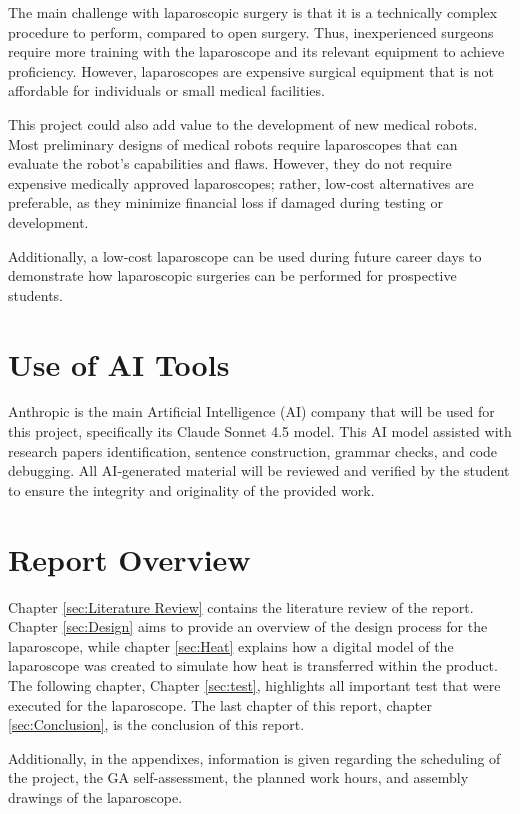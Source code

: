 The main challenge with laparoscopic surgery is that it is a technically complex procedure to perform, compared to open surgery. Thus, inexperienced surgeons require more training with the laparoscope and its relevant equipment to achieve proficiency. However, laparoscopes are expensive surgical equipment that is not affordable for individuals or small medical facilities. 



This project could also add value to the development of new medical robots. Most preliminary designs of medical robots require laparoscopes that can evaluate the robot’s capabilities and flaws. However, they do not require expensive medically approved laparoscopes; rather, low‑cost alternatives are preferable, as they minimize financial loss if damaged during testing or development. 



Additionally, a low‑cost laparoscope can be used during future career days to demonstrate how laparoscopic surgeries can be performed for prospective students. 



\section{Use of AI Tools}

Anthropic is the main Artificial Intelligence (AI) company that will be used for this project, specifically its Claude Sonnet 4.5 model. This AI model assisted with research papers identification, sentence construction, grammar checks, and code debugging. All AI‑generated material will be reviewed and verified by the student to ensure the integrity and originality of the provided work. 

\section{Report Overview}

 Chapter \ref{sec:Literature Review} contains the literature review of the report. Chapter \ref{sec:Design} aims to provide an overview of the design process for the laparoscope, while chapter \ref{sec:Heat} explains how a digital model of the laparoscope was created to simulate how heat is transferred within the product. The following chapter, Chapter \ref{sec:test}, highlights all important test that were executed for the laparoscope. The last chapter of this report, chapter \ref{sec:Conclusion}, is the conclusion of this report.

Additionally, in the appendixes, information is given regarding the scheduling of the project, the GA self-assessment, the planned work hours, and assembly drawings of the laparoscope.

